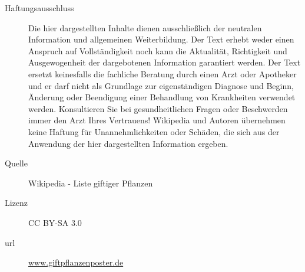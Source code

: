 \documentclass[a1,portrait]{a0poster}
\begin{document}
\begin{multicols*}{6}
\begin{description}
\item[Haftungsausschluss] Die hier dargestellten Inhalte dienen ausschließlich der neutralen Information und allgemeinen Weiterbildung. Der Text erhebt weder einen Anspruch auf Vollständigkeit noch kann die Aktualität, Richtigkeit und Ausgewogenheit der dargebotenen Information garantiert werden. Der Text ersetzt keinesfalls die fachliche Beratung durch einen Arzt oder Apotheker und er darf nicht als Grundlage zur eigenständigen Diagnose und Beginn, Änderung oder Beendigung einer Behandlung von Krankheiten verwendet werden. Konsultieren Sie bei gesundheitlichen Fragen oder Beschwerden immer den Arzt Ihres Vertrauens! Wikipedia und Autoren übernehmen keine Haftung für Unannehmlichkeiten oder Schäden, die sich aus der Anwendung der hier dargestellten Information ergeben.
\item[Quelle] Wikipedia - Liste giftiger Pflanzen

\item[Lizenz] CC BY-SA 3.0

\item[url] \url{www.giftpflanzenposter.de}
\end{description}

\end{multicols*}
\end{document}
